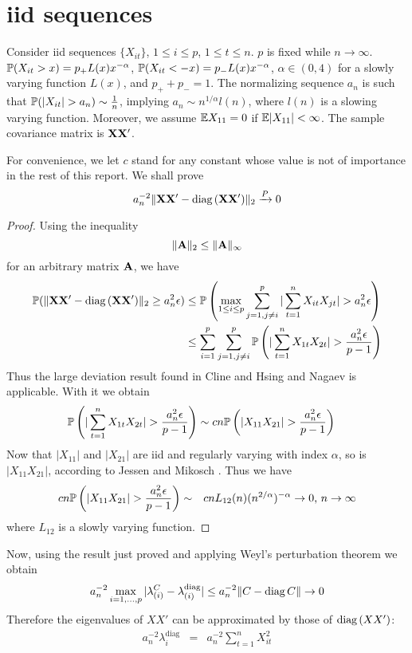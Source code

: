 \documentclass{article}
\begin{document}
\section{iid sequences}\label{sec:iid}
Consider iid sequences $\{X_{it}\}$, $1 \leq i \leq p$, $1 \leq t \leq
n$. $p$ is fixed while $n \to \infty$. $\mathbb{P}(X_{it} > x) = p_+ L(x)
x^{-\alpha}$, $\mathbb{P}(X_{it} < -x) = p_- L(x) x^{-\alpha}$, $\alpha \in
(0,4)$ for a slowly varying function $L(x)$, and $p_+ + p_- = 1$. The
normalizing sequence $a_n$ is such that $\mathbb{P}(|X_{it}| > a_n) \sim {1
  \over n}$, implying $a_n \sim n^{1/\alpha} l(n)$, where $l(n)$ is a
slowing varying function. Moreover, we assume $\mathbb{E} X_{11} = 0$ if $\mathbb{E}
|X_{11}| < \infty$. The sample covariance matrix is $\mathbf{XX'}$.

For convenience, we let $c$ stand for any constant whose value is not
of importance in the rest of this report. We shall prove
\[
a_n^{-2}\|\mathbf{XX'} - \text{diag\,}(\mathbf{XX'})\|_2 \xrightarrow{P} 0
\]

\begin{proof}
  Using the inequality
  \[
  \|\mathbf{A}\|_2 \leq \|\mathbf{A}\|_\infty
  \]
  for an arbitrary matrix $\mathbf{A}$, we have
  \begin{align*}
    \mathbb{P}(\|\mathbf{XX'} - \text{diag\,}(\mathbf{XX'})\|_2 \geq a_n^2 \epsilon) & \leq
    \mathbb{P}\left(\max_{1\leq i \leq p} \sum_{j=1, j\neq i}^p |\sum_{t=1}^n
    X_{it} X_{jt}| > a_n^2 \epsilon\right) \\
    &\leq \sum_{i=1}^p \sum_{j=1, j\neq i}^p \mathbb{P}\left(|\sum_{t=1}^n
    X_{1t} X_{2t}| > {a_n^2 \epsilon \over p-1}\right) \\
  \end{align*}
  Thus the large deviation result found in Cline and Hsing
  \cite{ClingHsing1998} and Nagaev \cite{nagaev1979} is
  applicable. With it we obtain
  \begin{align*}
    \mathbb{P}\left(|\sum_{t=1}^n X_{1t} X_{2t}| > {a_n^2 \epsilon \over p-1}\right)
    &\sim
    c n \mathbb{P}\left(|X_{11} X_{21}| > {a_n^2 \epsilon \over p-1 }\right)
  \end{align*}
  Now that $|X_{11}|$ and $|X_{21}|$ are iid and regularly varying
  with index $\alpha$, so is $|X_{11} X_{21}|$, according to Jessen
  and Mikosch \cite{JessenMikosch2006}. Thus we have
  \begin{eqnarray*}
    c n \mathbb{P}\left(|X_{11} X_{21}| > {a_n^2 \epsilon \over p-1 }\right)
    &\sim& c n L_{12}(n) (n^{2/\alpha})^{-\alpha} \to 0\text{,  }n\to\infty
  \end{eqnarray*}
  where $L_{12}$ is a slowly varying function.
\end{proof}
Now, using the result just proved and applying Weyl's perturbation
theorem we obtain
\[
a_n^{-2} \max_{i=1,\dots,p} |\lambda^C_{(i)} -
\lambda^{\text{diag}}_{(i)}| \leq  a_n^{-2}\|C - \text{diag\,}{C}\| \to 0
\]
Therefore the eigenvalues of $XX'$ can be approximated by those of
$\text{diag\,}(XX')$:
\begin{eqnarray*}
a_n^{-2}\lambda^{\text{diag}}_{i}  &=& a_n^{-2} \sum_{t=1}^n X_{it}^2
\end{eqnarray*}
\end{document}
